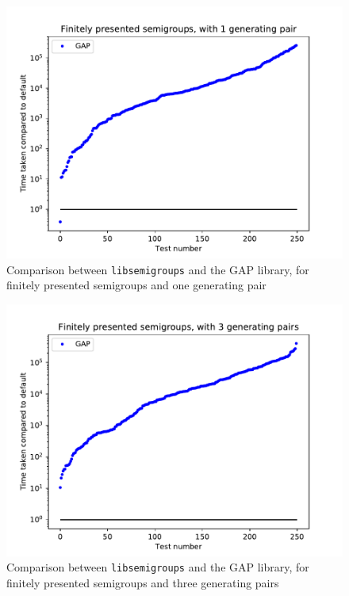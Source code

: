 \begin{figure}[h]
  \centering
  \includegraphics[width=\textwidth]{pics/ch-pairs/bench-fp-1p-gap}
  \caption{Comparison between \texttt{libsemigroups} and the GAP library, for
    finitely presented semigroups and one generating pair}
  \label{fig:bench-fp-1p-gap}
\end{figure}

\begin{figure}[h]
  \centering
  \includegraphics[width=\textwidth]{pics/ch-pairs/bench-fp-3p-gap}
  \caption{Comparison between \texttt{libsemigroups} and the GAP library, for
    finitely presented semigroups and three generating pairs}
  \label{fig:bench-fp-3p-gap}
\end{figure}

